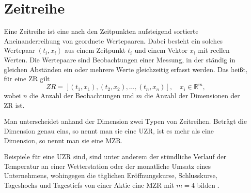 \section{Zeitreihe}
Eine Zeitreihe ist eine nach den Zeitpunkten aufsteigend sortierte Aneinanderreihung von geordnete Wertepaaren. Dabei besteht ein solches Wertepaar $(t_i, x_i)$ aus einem Zeitpunkt $t_i$ und einem Vektor $x_i$ mit reellen Werten. Die Wertepaare sind Beobachtungen einer Messung, in der ständig in gleichen Abständen ein oder mehrere Werte gleichzeitig erfasst werden. Das heißt, für eine \ac{ZR} gilt 
\begin{equation}
    ZR=[(t_1,x_1),(t_2,x_2),\ldots,(t_n,x_n)], \quad x_i \in \mathbb{R}^m,
\end{equation}
wobei $n$ die Anzahl der Beobachtungen und $m$ die Anzahl der Dimensionen der \acs{ZR} ist. 

Man unterscheidet anhand der Dimension zwei Typen von Zeitreihen. Beträgt die Dimension genau eins, so nennt man sie eine \ac{UZR}, ist es mehr als eine Dimension, so nennt man sie eine \ac{MZR}.

Beispiele für eine \acs{UZR} sind, sind unter anderem der stündliche Verlauf der Temperatur an einer Wetterstation oder der monatliche Umsatz eines Unternehmens, wohingegen die täglichen Eröffnungskurse, Schlusskurse, Tageshochs und Tagestiefs von einer Aktie eine \acs{MZR} mit $m=4$ bilden \cite[Ch. 3.1]{gc2023}.